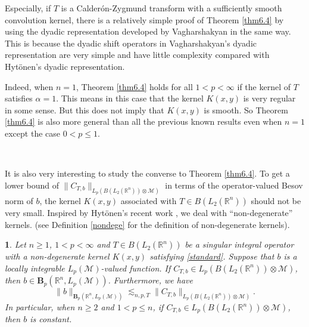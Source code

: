\documentclass[oneside,english,a4wide]{amsart}
\numberwithin{equation}{section}
\numberwithin{figure}{section}
\theoremstyle{plain}
\newtheorem{thm}{\protect\theoremname}[section]
\theoremstyle{plain}
\theoremstyle{definition}
\theoremstyle{plain}
\theoremstyle{remark}
\theoremstyle{definition}
\theoremstyle{remark}
\theoremstyle{definition}
\providecommand{\theoremname}{Theorem}
\newcommand{\8}{\infty}
\begin{document}
  Especially, if $T$ is a Calderón-Zygmund transform with a sufficiently smooth convolution kernel, there is a relatively simple proof of Theorem \ref{thm6.4} by using the dyadic representation developed by Vagharshakyan \cite{Va2010} in the same way. This is because the dyadic shift operators in  Vagharshakyan's dyadic representation are very simple and have little complexity compared with Hyt\"{o}nen's dyadic representation.
  
Indeed, when $n=1$, Theorem \ref{thm6.4} holds for all $1<p<\8$ if the kernel of $T$ satisfies $\alpha=1$. This means in this case that the kernel $K(x,y)$ is very regular in some sense. But this does not imply that $K(x, y)$ is smooth. So Theorem \ref{thm6.4} is also more general than all the previous known results even when $n=1$ except the case $0<p\leq 1$.

\

It is also very interesting to study the converse to Theorem \ref{thm6.4}. To get a lower bound of  $\| C_{T, b}\|_{L_p(B(L_2(\mathbb{R}^n))\otimes \mathcal{M})}$ in terms of the operator-valued Besov norm of $b$, the kernel $K(x, y)$ associated with $T\in B(L_2(\mathbb{R}^n))$ should not be very small. Inspired by Hyt\"{o}nen's recent work \cite{TH3}, we deal with ``non-degenerate'' kernels. (see Definition \ref{nondege} for the definition of non-degenerate kernels).

\begin{thm}\label{nonschatten}
	Let $n\geq 1$, $1<p<\infty$ and $T\in B(L_2(\mathbb{R}^n))$ be a singular integral operator with a non-degenerate kernel $K(x,y)$ satisfying \eqref{standard}. Suppose that $b$ is a locally integrable $L_p(\mathcal{M})$-valued function. If $ C_{T, b}\in L_p(B(L_2(\mathbb{R}^n))\otimes \mathcal{M})$, then $b\in \pmb{B}_p(\mathbb{R}^n, L_p(\mathcal{M}))$. Furthermore, we have
	\begin{equation*}
		\|b\|_{\pmb{B}_p(\mathbb{R}^n, L_p(\mathcal{M}))}\lesssim_{n,p,T} \| C_{T, b}\|_{L_p(B(L_2(\mathbb{R}^n))\otimes \mathcal{M})}.
	\end{equation*}
In particular, when $n\geq 2$ and $1<p\leq n$, if $ C_{T, b}\in L_p(B(L_2(\mathbb{R}^n))\otimes \mathcal{M})$, then $b$ is constant.
\end{thm}
\end{document}
